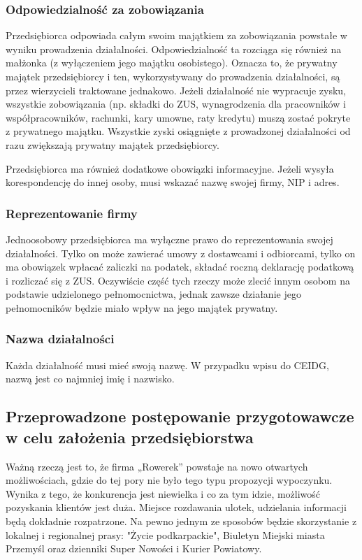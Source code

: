 \documentclass{sprawozdanie-agh}
\begin{document}
		\subsubsection{Odpowiedzialność za zobowiązania}
		Przedsiębiorca odpowiada całym swoim majątkiem za zobowiązania powstałe w wyniku prowadzenia działalności. Odpowiedzialność ta rozciąga się również na małżonka (z wyłączeniem jego majątku osobistego). Oznacza to, że prywatny majątek przedsiębiorcy i ten, wykorzystywany do prowadzenia działalności, są przez wierzycieli traktowane jednakowo. Jeżeli działalność nie wypracuje zysku, wszystkie zobowiązania (np. składki do ZUS, wynagrodzenia dla pracowników i współpracowników, rachunki, kary umowne, raty kredytu) muszą zostać pokryte z prywatnego majątku. Wszystkie zyski osiągnięte z prowadzonej działalności od razu zwiększają prywatny majątek przedsiębiorcy.

		Przedsiębiorca ma również dodatkowe obowiązki informacyjne. Jeżeli wysyła korespondencję do innej osoby, musi wskazać nazwę swojej firmy, NIP i adres.

		\subsubsection{Reprezentowanie firmy}
		Jednoosobowy przedsiębiorca ma wyłączne prawo do reprezentowania swojej działalności. Tylko on może zawierać umowy z dostawcami i odbiorcami, tylko on ma obowiązek wpłacać zaliczki na podatek, składać roczną deklarację podatkową i rozliczać się z ZUS. Oczywiście część tych rzeczy może zlecić innym osobom na podstawie udzielonego pełnomocnictwa, jednak zawsze działanie jego pełnomocników będzie miało wpływ na jego majątek prywatny.

		\subsubsection{Nazwa działalności}
		Każda działalność musi mieć swoją nazwę. W przypadku wpisu do CEIDG, nazwą jest co najmniej imię i nazwisko.
		
		\subsection{Przeprowadzone postępowanie przygotowawcze w celu założenia przedsiębiorstwa}
		Ważną rzeczą jest to, że firma „Rowerek” powstaje na nowo otwartych możliwościach, gdzie do tej pory nie było tego typu propozycji wypoczynku. Wynika z tego, że konkurencja jest niewielka i co za tym idzie, możliwość pozyskania klientów jest duża. Miejsce rozdawania ulotek, udzielania informacji będą dokładnie rozpatrzone. Na pewno jednym ze sposobów będzie skorzystanie z lokalnej i regionalnej prasy: "Życie podkarpackie", Biuletyn Miejski miasta Przemyśl oraz dzienniki Super Nowości i Kurier Powiatowy.
		
\end{document}
